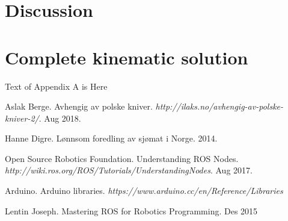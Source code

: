 \documentclass[11pt,a4paper, titlepage]{article}
\begin{document}
	\section{Discussion}
	



\appendix
\section{Complete kinematic solution}

Text of Appendix A is Here
	
	
\begin{thebibliography}{1}

 Aslak Berge. Avhengig av polske kniver. \textit{http://ilaks.no/avhengig-av-polske-kniver-2/}. Aug 2018.

 Hanne Digre. Lønnsom foredling av sjømat i Norge. 2014.

 Open Source Robotics Foundation. Understanding ROS Nodes.
\textit{http://wiki.ros.org/ROS/Tutorials/UnderstandingNodes}. Aug 2017.

 Arduino. Arduino libraries. \textit{https://www.arduino.cc/en/Reference/Libraries}

 Lentin Joseph. Mastering ROS for Robotics Programming. Des 2015

\newpage	

\end{thebibliography}	
	
\end{document}
